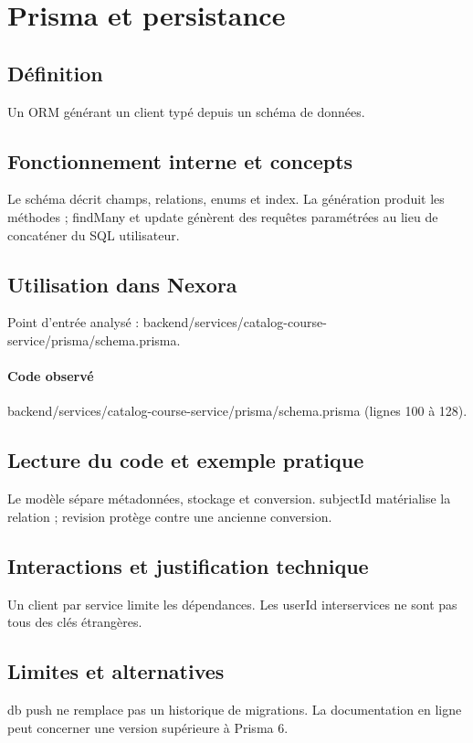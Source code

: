 \section{Prisma et persistance}
\subsection*{Définition}
Un ORM générant un client typé depuis un schéma de données.

\subsection*{Fonctionnement interne et concepts}
Le schéma décrit champs, relations, enums et index. La génération produit les méthodes ; findMany et update génèrent des requêtes paramétrées au lieu de concaténer du SQL utilisateur.

\subsection*{Utilisation dans Nexora}
Point d’entrée analysé : backend/services/catalog-course-service/prisma/schema.prisma.

\paragraph{Code observé} backend/services/catalog-course-service/prisma/schema.prisma (lignes 100 à 128).

\subsection*{Lecture du code et exemple pratique}
Le modèle sépare métadonnées, stockage et conversion. subjectId matérialise la relation ; revision protège contre une ancienne conversion.

\subsection*{Interactions et justification technique}
Un client par service limite les dépendances. Les userId interservices ne sont pas tous des clés étrangères.

\subsection*{Limites et alternatives}
db push ne remplace pas un historique de migrations. La documentation en ligne peut concerner une version supérieure à Prisma 6.

